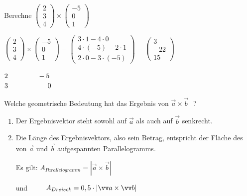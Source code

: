 \documentclass[paper=a6,landscape,ngerman,twoside=true,fontsize=12pt]{scrartcl}
\begin{document}
\begin{frage}

	Berechne  $\left(\begin{array}{c} 2 \\ 3 \\ 4\end{array} \right) \times \left(\begin{array}{c} -5 \\ 0 \\ 1\end{array} \right)$ 
	
\end{frage}
\begin{antwort}
	
	$\left(\begin{array}{c} 2 \\ 3 \\ 4\end{array} \right) \times \left(\begin{array}{c} -5 \\ 0 \\ 1\end{array} \right) =	\left(\begin{array}{c} 3 \cdot 1 - 4 \cdot 0 \\ 4 \cdot (-5) - 2 \cdot 1 \\ 2 \cdot 0 - 3 \cdot (-5)\end{array} \right)=\left(\begin{array}{c} 3 \\ -22 \\ 15\end{array} \right)$
	
	$2 \hspace{1.5cm}   -5\hspace{8.4cm}$
	$3 \hspace{2cm}   0\hspace{8.6cm}$
		
\end{antwort}	
\begin{frage}
	
	Welche geometrische Bedeutung hat das Ergebnis von $\vec{a}\times\vec{b}\textbf{ }$?
	
\end{frage}
\begin{antwort}
	
	\begin{enumerate}
		\item Der Ergebnisvektor steht sowohl auf $\vec{a}$ als auch auf $\vec{b}$ senkrecht.
		\item Die Länge des Ergebnisvektors, also sein Betrag, entspricht der Fläche des von $\vec{a}$ und $\vec{b}$ aufgespannten Parallelogramms.
		
		Es gilt: $A_{Parallelogramm}=|\vec{a} \times \vec{b}|$	
			
		und $\hspace{0.8cm} A_{Dreieck}=0,5 \cdot |\vec{a} \times \vec{b}|$			
	\end{enumerate}	
	
\end{antwort}	
\end{document}

